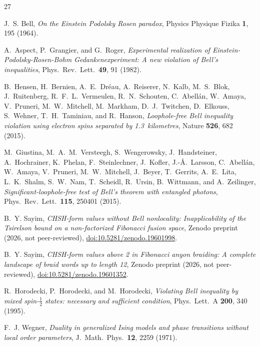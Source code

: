 \documentclass[aps,pra,twocolumn,superscriptaddress,showpacs,floatfix]{revtex4-2}
\begin{document}
\begin{thebibliography}{27}

J.~S. Bell,
\emph{On the Einstein Podolsky Rosen paradox},
Physics Physique Fizika \textbf{1}, 195 (1964).

A.~Aspect, P.~Grangier, and G.~Roger,
\emph{Experimental realization of Einstein-Podolsky-Rosen-Bohm Gedankenexperiment:
A new violation of Bell's inequalities},
Phys.\ Rev.\ Lett.\ \textbf{49}, 91 (1982).

B.~Hensen, H.~Bernien, A.~E.~Dr\'eau, A.~Reiserer, N.~Kalb, M.~S.~Blok,
J.~Ruitenberg, R.~F.~L.~Vermeulen, R.~N.~Schouten, C.~Abell\'an, W.~Amaya,
V.~Pruneri, M.~W.~Mitchell, M.~Markham, D.~J.~Twitchen, D.~Elkouss,
S.~Wehner, T.~H.~Taminiau, and R.~Hanson,
\emph{Loophole-free Bell inequality violation using electron spins separated by
1.3~kilometres},
Nature \textbf{526}, 682 (2015).

M.~Giustina, M.~A.~M.~Versteegh, S.~Wengerowsky, J.~Handsteiner,
A.~Hochrainer, K.~Phelan, F.~Steinlechner, J.~Kofler, J.-\AA{}.~Larsson,
C.~Abell\'an, W.~Amaya, V.~Pruneri, M.~W.~Mitchell, J.~Beyer, T.~Gerrits,
A.~E.~Lita, L.~K.~Shalm, S.~W.~Nam, T.~Scheidl, R.~Ursin, B.~Wittmann,
and A.~Zeilinger,
\emph{Significant-loophole-free test of Bell's theorem with entangled photons},
Phys.\ Rev.\ Lett.\ \textbf{115}, 250401 (2015).

B.~Y. Sayim,
\emph{CHSH-form values without Bell nonlocality: Inapplicability of the
Tsirelson bound on a non-factorized Fibonacci fusion space},
Zenodo preprint (2026, not peer-reviewed),
\href{https://doi.org/10.5281/zenodo.19601998}{doi:10.5281/zenodo.19601998}.

B.~Y. Sayim,
\emph{CHSH-form values above 2 in Fibonacci anyon braiding: A complete
landscape of braid words up to length 12},
Zenodo preprint (2026, not peer-reviewed),
\href{https://doi.org/10.5281/zenodo.19601352}{doi:10.5281/zenodo.19601352}.

R.~Horodecki, P.~Horodecki, and M.~Horodecki,
\emph{Violating Bell inequality by mixed spin-$\tfrac{1}{2}$ states: necessary and
sufficient condition},
Phys.\ Lett.\ A \textbf{200}, 340 (1995).

F.~J. Wegner,
\emph{Duality in generalized Ising models and phase transitions without local order
parameters},
J.\ Math.\ Phys.\ \textbf{12}, 2259 (1971).


\end{thebibliography}
\end{document}

